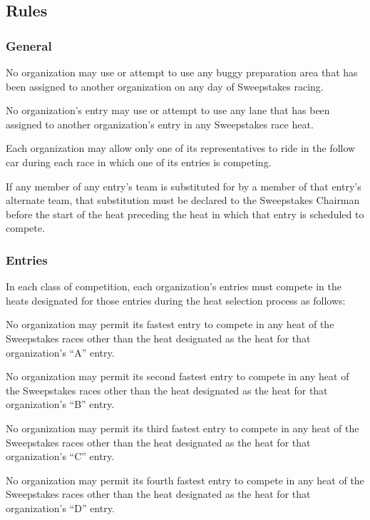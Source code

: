\subsection{Rules}

\subsubsection{General}

No organization may use or attempt to use any buggy preparation area that has been assigned to another organization on any day of Sweepstakes racing.

No organization's entry may use or attempt to use any lane that has been assigned to another organization's entry in any Sweepstakes race heat.

Each organization may allow only one of its representatives to ride in the follow car during each race in which one of its entries is competing.

If any member of any entry's team is substituted for by a member of that entry's alternate team, that substitution must be declared to the Sweepstakes Chairman before the start of the heat preceding the heat in which that entry is scheduled to compete.

\subsubsection{Entries}

In each class of competition, each organization's entries must compete in the heats designated for those entries during the heat selection process as follows:

No organization may permit its fastest entry to compete in any heat of the Sweepstakes races other than the heat designated as the heat for that organization's ``A'' entry.

No organization may permit its second fastest entry to compete in any heat of the Sweepstakes races other than the heat designated as the heat for that organization's ``B'' entry.

No organization may permit its third fastest entry to compete in any heat of the Sweepstakes races other than the heat designated as the heat for that organization's ``C'' entry.

No organization may permit its fourth fastest entry to compete in any heat of the Sweepstakes races other than the heat designated as the heat for that organization's ``D'' entry.

